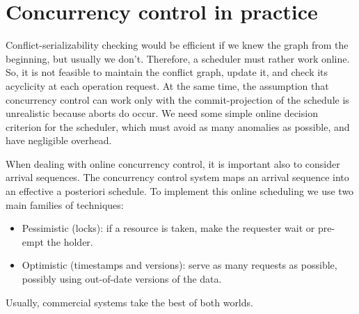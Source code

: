 \section{Concurrency control in practice}

Conflict-serializability checking would be efficient if we knew the graph from the beginning, but usually we don't. Therefore, a scheduler must rather work online. 
So, it is not feasible to maintain the conflict graph, update it, and check its acyclicity at each operation request. At the same time, the assumption that concurrency control 
can work only with the commit-projection of the schedule is unrealistic because aborts do occur. We need some simple online decision criterion for the scheduler, which must 
avoid as many anomalies as possible, and have negligible overhead. 
    
When dealing with online concurrency control, it is important also to consider arrival sequences. The concurrency control system maps an arrival sequence into an effective a 
posteriori schedule. To implement this online scheduling we use two main families of techniques:
\begin{itemize}
    \item Pessimistic (locks): if a resource is taken, make the requester wait or pre-empt the holder.
    \item Optimistic (timestamps and versions): serve as many requests as possible, possibly using out-of-date versions of the data. 
\end{itemize}
Usually, commercial systems take the best of both worlds. 